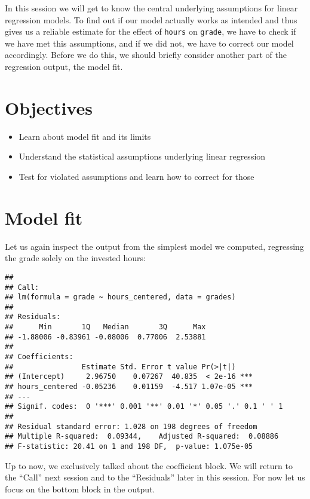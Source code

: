 \documentclass[
]{book}
\providecommand{\tightlist}{%
  \setlength{\itemsep}{0pt}\setlength{\parskip}{0pt}}
\begin{document}
In this session we will get to know the central underlying assumptions for linear
regression models. To find out if our model actually works as intended and thus
gives us a reliable estimate for the effect of \texttt{hours} on \texttt{grade}, we have to
check if we have met this assumptions, and if we did not, we have to correct our
model accordingly. Before we do this, we should briefly consider another part
of the regression output, the model fit.

\hypertarget{objectives-5}{%
\section{Objectives}\label{objectives-5}}

\begin{itemize}
\tightlist
\item
  Learn about model fit and its limits
\item
  Understand the statistical assumptions underlying linear regression
\item
  Test for violated assumptions and learn how to correct for those
\end{itemize}

\hypertarget{model-fit}{%
\section{Model fit}\label{model-fit}}

Let us again inspect the output from the simplest model we computed, regressing
the grade solely on the invested hours:

\begin{verbatim}
## 
## Call:
## lm(formula = grade ~ hours_centered, data = grades)
## 
## Residuals:
##      Min       1Q   Median       3Q      Max 
## -1.88006 -0.83961 -0.08006  0.77006  2.53881 
## 
## Coefficients:
##                Estimate Std. Error t value Pr(>|t|)    
## (Intercept)     2.96750    0.07267  40.835  < 2e-16 ***
## hours_centered -0.05236    0.01159  -4.517 1.07e-05 ***
## ---
## Signif. codes:  0 '***' 0.001 '**' 0.01 '*' 0.05 '.' 0.1 ' ' 1
## 
## Residual standard error: 1.028 on 198 degrees of freedom
## Multiple R-squared:  0.09344,    Adjusted R-squared:  0.08886 
## F-statistic: 20.41 on 1 and 198 DF,  p-value: 1.075e-05
\end{verbatim}

Up to now, we exclusively talked about the coefficient block. We will return to
the ``Call'' next session and to the ``Residuals'' later in this session. For now
let us focus on the bottom block in the output.
\end{document}
